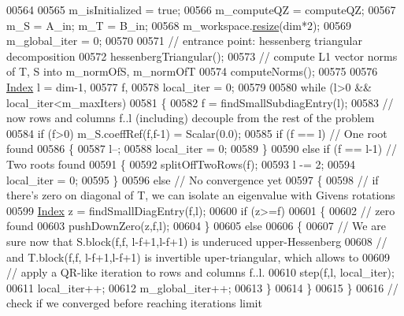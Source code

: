 \begin{DoxyCode}
00564 
00565       m\_isInitialized = \textcolor{keyword}{true};
00566       m\_computeQZ = computeQZ;
00567       m\_S = A\_in; m\_T = B\_in;
00568       m\_workspace.\hyperlink{class_eigen_1_1_plain_object_base_a99d9054ee2d5a40c6e00ded0265e9cea}{resize}(dim*2);
00569       m\_global\_iter = 0;
00570 
00571       \textcolor{comment}{// entrance point: hessenberg triangular decomposition}
00572       hessenbergTriangular();
00573       \textcolor{comment}{// compute L1 vector norms of T, S into m\_normOfS, m\_normOfT}
00574       computeNorms();
00575 
00576       \hyperlink{group___eigenvalues___module_a6201e534e901b5f4e66f72c176b534a3}{Index} l = dim-1, 
00577             f, 
00578             local\_iter = 0;
00579 
00580       \textcolor{keywordflow}{while} (l>0 && local\_iter<m\_maxIters)
00581       \{
00582         f = findSmallSubdiagEntry(l);
00583         \textcolor{comment}{// now rows and columns f..l (including) decouple from the rest of the problem}
00584         \textcolor{keywordflow}{if} (f>0) m\_S.coeffRef(f,f-1) = Scalar(0.0);
00585         \textcolor{keywordflow}{if} (f == l) \textcolor{comment}{// One root found}
00586         \{
00587           l--;
00588           local\_iter = 0;
00589         \}
00590         \textcolor{keywordflow}{else} \textcolor{keywordflow}{if} (f == l-1) \textcolor{comment}{// Two roots found}
00591         \{
00592           splitOffTwoRows(f);
00593           l -= 2;
00594           local\_iter = 0;
00595         \}
00596         \textcolor{keywordflow}{else} \textcolor{comment}{// No convergence yet}
00597         \{
00598           \textcolor{comment}{// if there's zero on diagonal of T, we can isolate an eigenvalue with Givens rotations}
00599           \hyperlink{group___eigenvalues___module_a6201e534e901b5f4e66f72c176b534a3}{Index} z = findSmallDiagEntry(f,l);
00600           \textcolor{keywordflow}{if} (z>=f)
00601           \{
00602             \textcolor{comment}{// zero found}
00603             pushDownZero(z,f,l);
00604           \}
00605           \textcolor{keywordflow}{else}
00606           \{
00607             \textcolor{comment}{// We are sure now that S.block(f,f, l-f+1,l-f+1) is underuced upper-Hessenberg }
00608             \textcolor{comment}{// and T.block(f,f, l-f+1,l-f+1) is invertible uper-triangular, which allows to}
00609             \textcolor{comment}{// apply a QR-like iteration to rows and columns f..l.}
00610             step(f,l, local\_iter);
00611             local\_iter++;
00612             m\_global\_iter++;
00613           \}
00614         \}
00615       \}
00616       \textcolor{comment}{// check if we converged before reaching iterations limit}

\end{DoxyCode}
